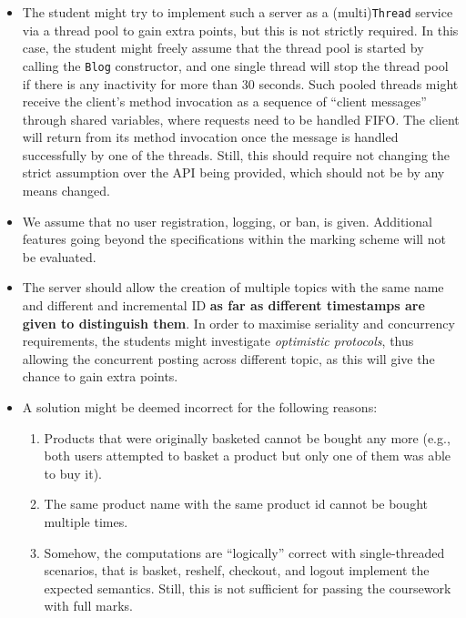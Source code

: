 \documentclass{article}
\begin{document}
\begin{itemize}
 \item The student might try to implement such a server as a (multi)\texttt{Thread} service via a thread pool to gain extra points, but this is not strictly required. In this case, the student might freely assume that the thread pool is started  by calling the \texttt{Blog} constructor, and one single thread will stop the thread pool if there is any inactivity for more than 30 seconds. Such pooled threads might receive the client's method invocation as a sequence of ``client messages'' through shared
		variables, where requests need to be handled FIFO. The client will return from its method invocation once the message is handled successfully by one of the threads.
Still, this should require not changing the strict assumption over the API being provided, which should not be by any means changed.
		\item We assume that no user registration, logging, or ban, is given. Additional features going beyond the specifications within the marking scheme will not be evaluated. 
		\item The server should allow the creation of multiple topics with the same name and different and incremental ID \textbf{as far as different timestamps are given to distinguish them}. In order to maximise seriality and concurrency requirements, the students might investigate \textit{optimistic protocols}, thus allowing the concurrent posting across different topic, as this will give the chance to gain extra points.
		\item A solution might be deemed incorrect for the following reasons:
		\begin{enumerate}
		\item Products that were originally basketed cannot be bought any more (e.g., both users attempted to basket a product but only one of them was able to buy it).
	\item The same product name with the same product id cannot be bought multiple times.

		\item Somehow, the computations are ``logically'' correct with single-threaded scenarios, that is \textsf{basket}, \textsf{reshelf}, \textsf{checkout}, and \textsf{logout} implement the expected semantics. Still, this is not sufficient for passing the coursework with full marks. 
		\end{enumerate}
	\end{itemize}
	
\end{document}
